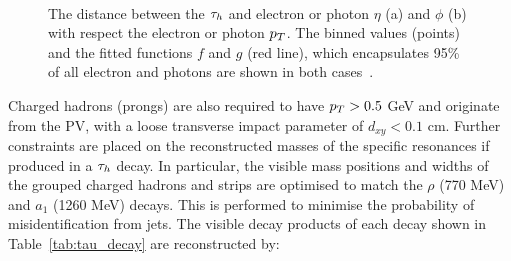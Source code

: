 \begin{figure}[t]
\centering
     \\
\caption[Plots of the fit performed for dynamical strip sizes for the HPS algorithm.]{The distance between the $\tau_{h}$ and electron or photon $\eta$ (a) and $\phi$ (b) with respect the electron or photon $p_{T}$. The binned values (points) and the fitted functions $f$ and $g$ (red line), which encapsulates 95\% of all electron and photons are shown in both cases~\cite{Sirunyan:2018pgf}.}
\label{fig:hps}
\end{figure}

Charged hadrons (prongs) are also required to have $p_{T} > 0.5$ GeV and originate from the \ac{PV}, with a loose transverse impact parameter of $d_{xy} < 0.1$ cm.
Further constraints are placed on the reconstructed masses of the specific resonances if produced in a $\tau_{h}$ decay.
In particular, the visible mass positions and widths of the grouped charged hadrons and strips are optimised to match the $\rho$ (770 MeV) and $a_1$ (1260 MeV) decays.
This is performed to minimise the probability of misidentification from jets.
The visible decay products of each decay shown in Table~\ref{tab:tau_decay} are reconstructed by:

